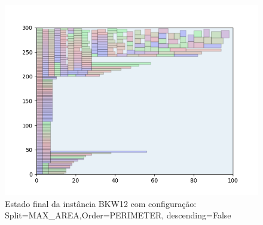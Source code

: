 \begin{figure}[H]
    \centering
    \caption[]{Estado final da instância BKW12 com configuração: Split=MAX_AREA,Order=PERIMETER, descending=False}
    \label{fig:bkw12-max_area-perimeter-false}
    \includegraphics[scale=0.5]{output/figures/bkw/bkw12/max_area/perimeter/false/000}
\end{figure}